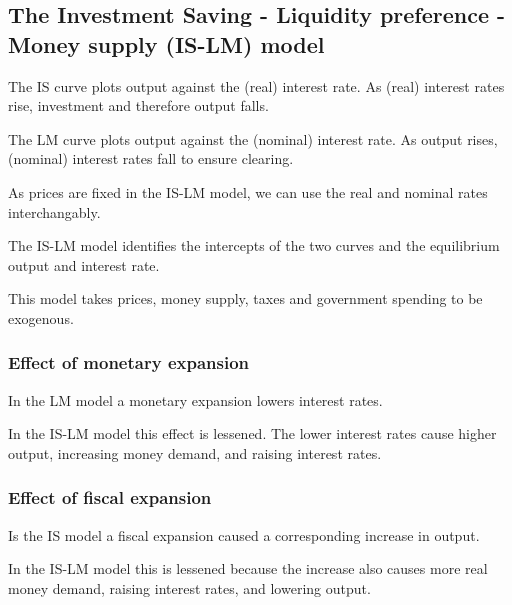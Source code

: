 
\subsection{The Investment Saving - Liquidity preference - Money supply (IS-LM) model}

The IS curve plots output against the (real) interest rate. As (real) interest rates rise, investment and therefore output falls.

The LM curve plots output against the (nominal) interest rate. As output rises, (nominal) interest rates fall to ensure clearing.

As prices are fixed in the IS-LM model, we can use the real and nominal rates interchangably.

The IS-LM model identifies the intercepts of the two curves and the equilibrium output and interest rate.

This model takes prices, money supply, taxes and government spending to be exogenous.

\subsubsection{Effect of monetary expansion}

In the LM model a monetary expansion lowers interest rates.

In the IS-LM model this effect is lessened. The lower interest rates cause higher output, increasing money demand, and raising interest rates.

\subsubsection{Effect of fiscal expansion}

Is the IS model a fiscal expansion caused a corresponding increase in output.

In the IS-LM model this is lessened because the increase also causes more real money demand, raising interest rates, and lowering output.


